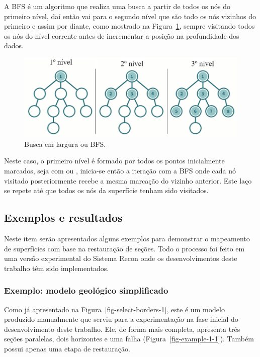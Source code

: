 A BFS é um algoritmo que realiza uma busca a partir de todos os nós do primeiro nível, daí então vai para o segundo nível que são todo os nós vizinhos do primeiro e assim por diante\cite{Nilsson}, como mostrado na Figura~\ref{fig-bfs}, sempre visitando todos os nós do nível corrente antes de incrementar a posição na profundidade dos dados.

\begin{figure} [h]
  \begin{center}
    \includegraphics[width=350pt]{images/fig-bfs}
    \caption{Busca em largura ou BFS.\cite{BFS}}\label{fig-bfs}
  \end{center}
\end{figure}

Neste caso, o primeiro nível é formado por todos os pontos inicialmente marcados, seja com  ou , inicia-se então a iteração com a BFS onde cada nó visitado posteriormente recebe a mesma marcação do vizinho anterior. Este laço se repete até que todos os nós da superfície tenham sido visitados.

\subsection{Exemplos e resultados}

Neste item serão apresentados alguns exemplos para demonstrar o mapeamento de superfícies com base na restauração de seções. Todo o processo foi feito em uma versão experimental do Sistema Recon onde os desenvolvimentos deste trabalho têm sido implementados.

\subsubsection{Exemplo: modelo geológico simplificado}

Como já apresentado na Figura~\ref{fig-select-borders-1}, este é um modelo produzido manualmente que serviu para a experimentação na fase inicial do desenvolvimento deste trabalho. Ele, de forma mais completa, apresenta três seções paralelas, dois horizontes e uma falha (Figura~\ref{fig-example-1-1}). Também possui apenas uma etapa de restauração. 

